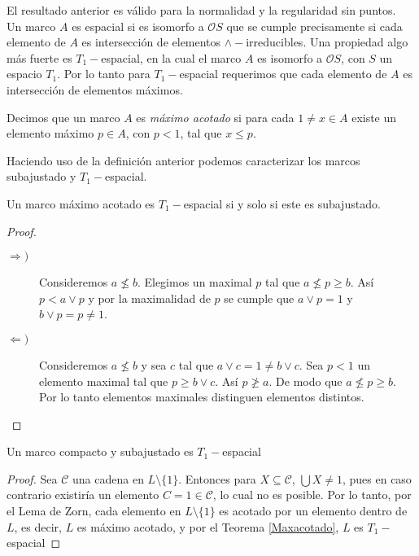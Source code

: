 El resultado anterior es válido para la normalidad y la regularidad sin puntos.\\

Un marco $A$ es espacial si es isomorfo a $\mathcal{O}S$ que se cumple precisamente si cada elemento de $A$ es intersección de elementos $\wedge-$irreducibles. Una propiedad algo más fuerte es $T_1-$espacial, en la cual el marco $A$ es isomorfo a $\mathcal{O}S$, con $S$ un espacio $T_1$. Por lo tanto para $T_1-$espacial requerimos que cada elemento de $A$ es intersección de elementos máximos.

\begin{dfn}\label{Maximoacotado}
    Decimos que un marco $A$ es \emph{máximo acotado} si para cada $1\neq x\in A$ existe un elemento máximo $p\in A$, con $p< 1$, tal que $x\leq p$.
\end{dfn}

Haciendo uso de la definición anterior podemos caracterizar los marcos subajustado y $T_1-$espacial.

\begin{thm}\label{Maxacotado}
    Un marco máximo acotado es $T_1-$espacial si y solo si este es subajustado.
\end{thm}

\begin{proof}
    \begin{description}
        \item[$\Rightarrow )$] Consideremos $a\nleq b$. Elegimos un maximal $p$ tal que $a\nleq p \geq b$. Así $p< a\vee p$  y por la maximalidad de $p$ se cumple que $a\vee p=1$ y $b\vee p=p\neq 1$. 
        \item[$\Leftarrow )$] Consideremos $a\nleq b$ y sea $c$ tal que $a\vee c=1\neq b\vee c$. Sea  
        $p< 1$ un elemento maximal tal que $p\geq b\vee c$. Así $p\ngeq a$. De modo que $a\nleq p \geq b$. Por lo tanto elementos maximales distinguen elementos distintos.
    \end{description}
\end{proof}

\begin{thm}\label{EspecializacionIsbell}
    Un marco compacto y subajustado es $T_1-$espacial
\end{thm}

\begin{proof}
    Sea $\mathcal{C}$ una cadena en $L\setminus \{1\}$. Entonces para $X\subseteq \mathcal{C}$, $\bigcup X\neq 1$, pues en caso contrario existiría un elemento $C=1\in \mathcal{C}$, lo cual no es posible. Por lo tanto, por el Lema de Zorn, cada elemento en $L\setminus \{1\}$ es acotado por un elemento dentro de $L$, es decir, $L$ es máximo acotado, y por el Teorema \ref{Maxacotado}, $L$ es $T_1-$espacial
\end{proof}

